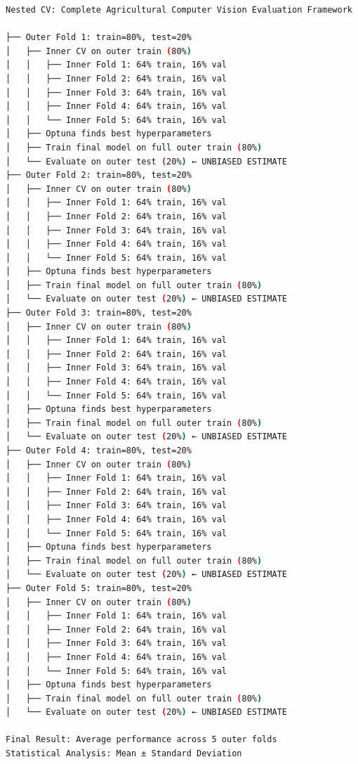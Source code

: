 \begin{lstlisting}[language=bash, caption=Nested Cross-Validation Structure]
Nested CV: Complete Agricultural Computer Vision Evaluation Framework

├── Outer Fold 1: train=80%, test=20% 
│   ├── Inner CV on outer train (80%) 
│   │   ├── Inner Fold 1: 64% train, 16% val 
│   │   ├── Inner Fold 2: 64% train, 16% val   
│   │   ├── Inner Fold 3: 64% train, 16% val   
│   │   ├── Inner Fold 4: 64% train, 16% val   
│   │   └── Inner Fold 5: 64% train, 16% val   
│   ├── Optuna finds best hyperparameters 
│   ├── Train final model on full outer train (80%) 
│   └── Evaluate on outer test (20%) ← UNBIASED ESTIMATE 
├── Outer Fold 2: train=80%, test=20%
│   ├── Inner CV on outer train (80%) 
│   │   ├── Inner Fold 1: 64% train, 16% val 
│   │   ├── Inner Fold 2: 64% train, 16% val   
│   │   ├── Inner Fold 3: 64% train, 16% val   
│   │   ├── Inner Fold 4: 64% train, 16% val   
│   │   └── Inner Fold 5: 64% train, 16% val   
│   ├── Optuna finds best hyperparameters 
│   ├── Train final model on full outer train (80%) 
│   └── Evaluate on outer test (20%) ← UNBIASED ESTIMATE 
├── Outer Fold 3: train=80%, test=20%
│   ├── Inner CV on outer train (80%) 
│   │   ├── Inner Fold 1: 64% train, 16% val 
│   │   ├── Inner Fold 2: 64% train, 16% val   
│   │   ├── Inner Fold 3: 64% train, 16% val   
│   │   ├── Inner Fold 4: 64% train, 16% val   
│   │   └── Inner Fold 5: 64% train, 16% val   
│   ├── Optuna finds best hyperparameters 
│   ├── Train final model on full outer train (80%) 
│   └── Evaluate on outer test (20%) ← UNBIASED ESTIMATE 
├── Outer Fold 4: train=80%, test=20%
│   ├── Inner CV on outer train (80%) 
│   │   ├── Inner Fold 1: 64% train, 16% val 
│   │   ├── Inner Fold 2: 64% train, 16% val   
│   │   ├── Inner Fold 3: 64% train, 16% val   
│   │   ├── Inner Fold 4: 64% train, 16% val   
│   │   └── Inner Fold 5: 64% train, 16% val   
│   ├── Optuna finds best hyperparameters 
│   ├── Train final model on full outer train (80%) 
│   └── Evaluate on outer test (20%) ← UNBIASED ESTIMATE 
├── Outer Fold 5: train=80%, test=20%
│   ├── Inner CV on outer train (80%) 
│   │   ├── Inner Fold 1: 64% train, 16% val 
│   │   ├── Inner Fold 2: 64% train, 16% val   
│   │   ├── Inner Fold 3: 64% train, 16% val   
│   │   ├── Inner Fold 4: 64% train, 16% val   
│   │   └── Inner Fold 5: 64% train, 16% val   
│   ├── Optuna finds best hyperparameters 
│   ├── Train final model on full outer train (80%) 
│   └── Evaluate on outer test (20%) ← UNBIASED ESTIMATE 

Final Result: Average performance across 5 outer folds
Statistical Analysis: Mean ± Standard Deviation
\end{lstlisting}

